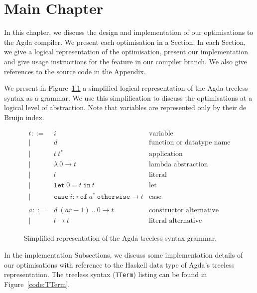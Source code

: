 \chapter{Main Chapter}
\label{cha:main_chapter}

In this chapter, we discuss the design and implementation of our optimisations to the Agda compiler. We present each optimisation in a Section. In each Section, we give a logical representation of the optimisation, present our implementation and give usage instructions for the feature in our compiler branch. We also give references to the source code in the Appendix.

We present in Figure~\ref{fig:treeless_grammar} a simplified logical representation of the Agda treeless syntax as a grammar. We use this simplification to discuss the optimisations at a logical level of abstraction. Note that variables are represented only by their de Bruijn index.

\begin{figure}[h!]
\begin{align*}
t ::=~& i & \text{variable}\\
|~& d & \text{function or datatype name}\\
|~& t~t^* & \text{application}\\
|~& \lambda~0 \to t & \text{lambda abstraction}\\
|~& l & \text{literal}\\
|~& \mathtt{let}~0 = t~\mathtt{in}~t & \text{let}\\
|~& \mathtt{case}~i : \tau~\mathtt{of}~a^*~\mathtt{otherwise} \to t& \text{case}\\
\\
a ::=~& d~(ar-1)~..~0 \to t & \text{constructor alternative}\\
|~& l \to t & \text{literal alternative}
\end{align*}
\caption{Simplified representation of the Agda treeless syntax grammar.}
\label{fig:treeless_grammar}
\end{figure}

In the implementation Subsections, we discuss some implementation details of our optimisations with reference to the Haskell data type of Agda's treeless representation. The treeless syntax (\lstinline{TTerm}) listing can be found in Figure~\ref{code:TTerm}.


